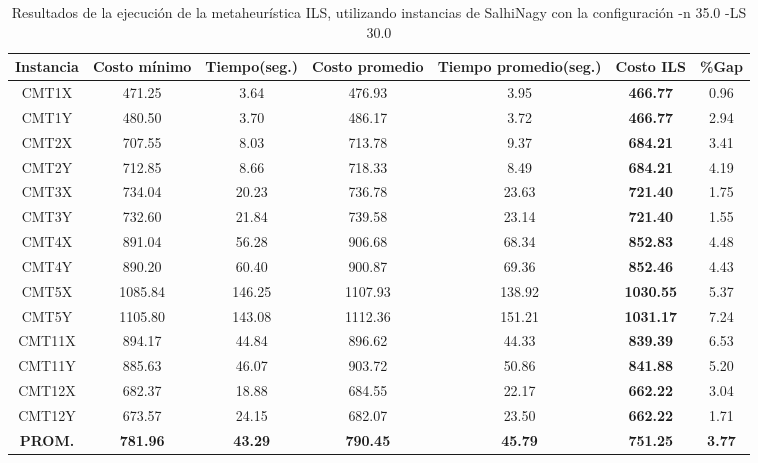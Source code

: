 \begin{table}[ht]
\caption{Resultados de la ejecución de la metaheurística ILS, utilizando instancias de SalhiNagy con la configuración -n 35.0 -LS 30.0}
\centering
\small
\begin{tabular}{c c c c c c c}
\hline\hline
Instancia & Costo mínimo & Tiempo(seg.) & Costo promedio & Tiempo promedio(seg.) & Costo ILS & \%Gap \\ [0.5ex]
\hline
CMT1X & 471.25 & 3.64 & 
476.93 & 3.95 & \bf{466.77} & 
0.96\\CMT1Y & 480.50 & 3.70 & 
486.17 & 3.72 & \bf{466.77} & 
2.94\\CMT2X & 707.55 & 8.03 & 
713.78 & 9.37 & \bf{684.21} & 
3.41\\CMT2Y & 712.85 & 8.66 & 
718.33 & 8.49 & \bf{684.21} & 
4.19\\CMT3X & 734.04 & 20.23 & 
736.78 & 23.63 & \bf{721.40} & 
1.75\\CMT3Y & 732.60 & 21.84 & 
739.58 & 23.14 & \bf{721.40} & 
1.55\\CMT4X & 891.04 & 56.28 & 
906.68 & 68.34 & \bf{852.83} & 
4.48\\CMT4Y & 890.20 & 60.40 & 
900.87 & 69.36 & \bf{852.46} & 
4.43\\CMT5X & 1085.84 & 146.25 & 
1107.93 & 138.92 & \bf{1030.55} & 
5.37\\CMT5Y & 1105.80 & 143.08 & 
1112.36 & 151.21 & \bf{1031.17} & 
7.24\\CMT11X & 894.17 & 44.84 & 
896.62 & 44.33 & \bf{839.39} & 
6.53\\CMT11Y & 885.63 & 46.07 & 
903.72 & 50.86 & \bf{841.88} & 
5.20\\CMT12X & 682.37 & 18.88 & 
684.55 & 22.17 & \bf{662.22} & 
3.04\\CMT12Y & 673.57 & 24.15 & 
682.07 & 23.50 & \bf{662.22} & 
1.71\\\bf{PROM.} & 
\bf{781.96} & \bf{43.29} & \bf{790.45} & \bf{45.79} & \bf{751.25} & \bf{3.77}\\[1ex]\hline
\end{tabular}
\label{table:nonlin}
\end{table} \clearpage
